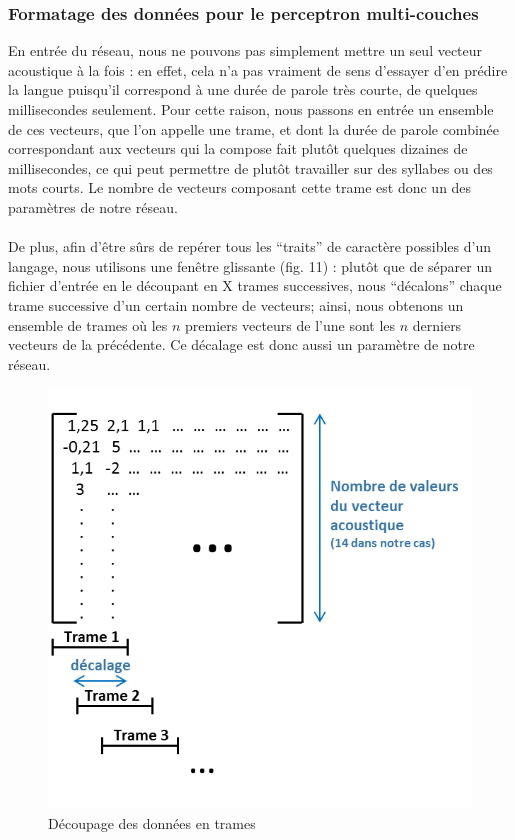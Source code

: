 \documentclass{article}
\begin{document}
\subsubsection{Formatage des données pour le perceptron multi-couches}

En entrée du réseau, nous ne pouvons pas simplement mettre un seul vecteur acoustique à la fois : en effet, cela n'a pas vraiment de sens d'essayer d'en prédire la langue puisqu'il correspond à une durée de parole très courte, de quelques millisecondes seulement. Pour cette raison, nous passons en entrée un ensemble de ces vecteurs, que l'on appelle une trame, et dont la durée de parole combinée correspondant aux vecteurs qui la compose fait plutôt quelques dizaines de millisecondes, ce qui peut permettre de plutôt travailler sur des syllabes ou des mots courts. Le nombre de vecteurs composant cette trame est donc un des paramètres de notre réseau.\\
 \\
De plus, afin d'être sûrs de repérer tous les ``traits'' de caractère possibles d'un langage, nous utilisons une fenêtre glissante (fig. 11) : plutôt que de séparer un fichier d'entrée en le découpant en X trames successives, nous ``décalons'' chaque trame successive d'un certain nombre de vecteurs; ainsi, nous obtenons un ensemble de trames où les $n$ premiers vecteurs de l'une sont les $n$ derniers vecteurs de la précédente. Ce décalage est donc aussi un paramètre de notre réseau.

\hphantom{.}
\begin{figure}[h]
  \centerline{\includegraphics[scale=0.8]{img/schema_decoupage_trame.png}}
  \caption{Découpage des données en trames}
\end{figure}
\end{document}
